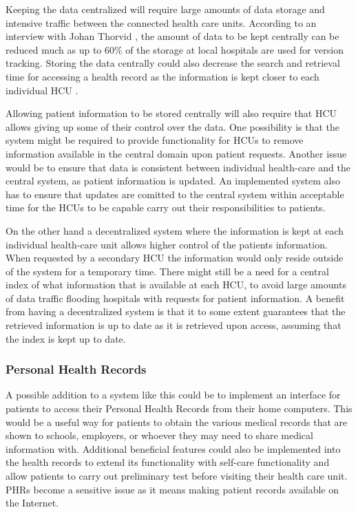 \documentclass[14pt]{article}
\begin{document}
Keeping the data centralized will require large amounts of data storage and intensive traffic between the connected health care units. According to an interview with Johan Thorvid \cite{Cambio}, the amount of data to be kept centrally can be reduced much as up to 60\% of the storage at local hospitals are used for version tracking. Storing the data centrally could also decrease the search and retrieval time for accessing a health record as the information is kept closer to each individual \gls{HCU} \cite{Cambio}.

Allowing patient information to be stored centrally will also require that \gls{HCU} allows giving up some of their control over the data. One possibility is that the system might be required to provide functionality for \glspl{HCU} to remove information available in the central domain upon patient requests. Another issue would be to ensure that data is consistent between individual health-care and the central system, as patient information is updated. An implemented system also has to ensure that updates are comitted to the central system within acceptable time for the \glspl{HCU} to be capable carry out their responsibilities to patients.

On the other hand a decentralized system where the information is kept at each individual health-care unit allows higher control of the patients information. When requested by a secondary \gls{HCU} the information would only reside outside of the system for a temporary time. There might still be a need for a central index of what information that is available at each \gls{HCU}, to avoid large amounts of data traffic flooding hospitals with requests for patient information. A benefit from having a decentralized system is that it to some extent guarantees that the retrieved information is up to date as it is retrieved upon access, assuming that the index is kept up to date.

\subsubsection{Personal Health Records}
\label{sec:resultsPHR}
A possible addition to a system like this could be to implement an interface for patients to access their Personal Health Records from their home computers. This would be a useful way for patients to obtain the various medical records that are shown to schools, employers, or whoever they may need to share medical information with. Additional beneficial features could also be implemented into the health records to extend its functionality with self-care functionality and allow patients to carry out preliminary test before visiting their health care unit. \glspl{PHR} become a sensitive issue as it means making patient records available on the Internet.
\end{document}
